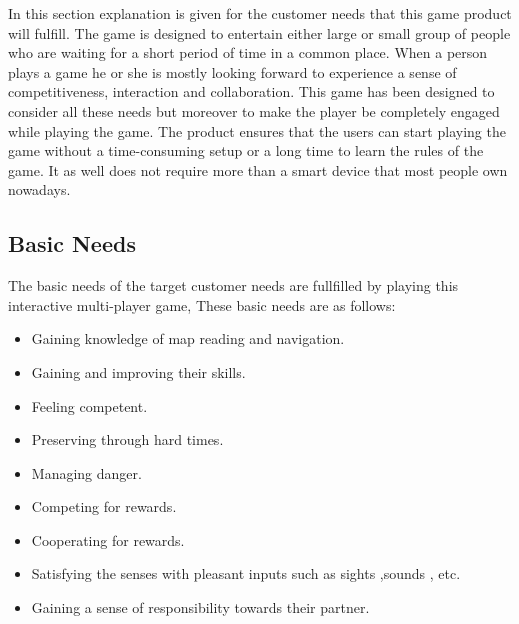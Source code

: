 

In this section explanation is given for the customer needs that this game product will fulfill. The game is designed to entertain either large or small group of people who are waiting for a short period of time in a common place. When a person plays a game he or she is mostly looking forward to experience a sense of competitiveness, interaction and collaboration. This game has been designed to consider all these needs but moreover to make the player be completely engaged while playing the game. The product ensures that the users can start playing the game without a time-consuming setup or a long time to learn the rules of the game. It as well does not require more than a smart device that most people own nowadays. 
 \subsection{Basic Needs}

 The basic needs of the target customer needs are fullfilled by playing this interactive multi-player game, These basic needs are as follows:
 \begin{itemize}
   	\item Gaining knowledge of map reading and navigation.
   	\item Gaining and improving their skills.
   	\item Feeling competent.
   	\item Preserving through hard times.
   	\item Managing danger.
   	\item Competing for rewards.
   	\item Cooperating for rewards.
   	\item Satisfying the senses with pleasant inputs such as sights ,sounds , etc.
   	\item Gaining a sense of responsibility towards their partner.
\end{itemize}  


     
